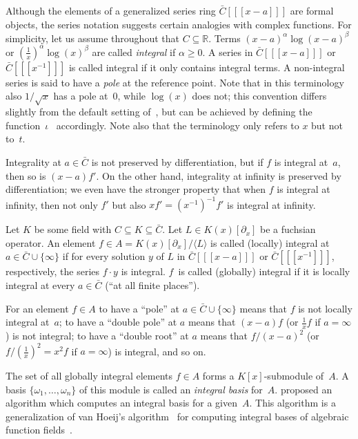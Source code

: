 \documentclass[final,1p,times,authoryear]{elsarticle}
\def\<#1>{\langle#1\rangle}
\let\set\mathbb
\begin{document}
Although the elements of a generalized series ring $\bar C[[[x-a]]]$ are formal
objects, the series notation suggests certain analogies with complex
functions.  For simplicity, let us assume throughout that $C\subseteq\set
R$. Terms $(x-a)^\alpha\log(x-a)^\beta$ or $(\tfrac1x)^\alpha\log(x)^\beta$ are
called \emph{integral} if $\alpha\geq0$. A series in
$\bar C[[[x-a]]]$ or $\bar C[[[x^{-1}]]]$ is called integral if it only contains integral
terms. A non-integral series is said to have a \emph{pole} at the reference
point. Note that in this terminology also $1/\sqrt{x}$ has a pole
at~$0$, while $\log(x)$ does not; this convention differs slightly from the
default setting of~\citep[Ex.~2]{kauers15b}, but can be achieved by defining
the function~$\iota$~\citep[Def.~1]{kauers15b} accordingly. Note also that
the terminology only refers to $x$ but not to~$t$.

Integrality at $a\in\bar C$ is not preserved by differentiation,
but if $f$ is integral at~$a$, then so is $(x-a)f'$. On the other hand,
integrality at infinity is preserved by differentiation; we even have the
stronger property that when $f$ is integral at infinity, then not only $f'$
but also $xf'=(x^{-1})^{-1}f'$ is integral at infinity.

Let $K$ be some field with $C\subseteq K\subseteq\bar C$.
Let $L\in K(x)[\partial_x]$ be a fuchsian operator. An element $f\in A=K(x)[\partial_x]/\<L>$
is called (locally) integral at $a\in\bar C\cup\{\infty\}$ if for every solution $y$
of $L$ in $\bar C[[[x-a]]]$ or $\bar C[[[x^{-1}]]]$, respectively, the series $f\cdot y$ is
integral. $f$~is called (globally) integral if it is locally integral at every
$a\in\bar C$ (``at all finite places'').

For an element $f\in A$ to have a ``pole'' at $a\in\bar C\cup\{\infty\}$ means
that $f$ is not locally integral at~$a$; to have a ``double pole'' at $a$ means
that $(x-a)f$ (or $\frac1xf$ if $a=\infty$) is not integral; to have a ``double
root'' at $a$ means that $f/(x-a)^2$ (or $f/(\frac1x)^2=x^2f$ if $a=\infty$) is integral,
and so on.

The set of all globally integral elements $f\in A$ forms a $K[x]$-submodule of~$A$.
A basis $\{\omega_1,\dots,\omega_n\}$ of this module is called an \emph{integral basis}
for~$A$. \cite{kauers15b} proposed an algorithm which computes an integral basis
for a given~$A$. This algorithm is a generalization of van Hoeij's
algorithm~\citep{vanHoeij94} for computing integral bases of algebraic function
fields~\citep{trager84,Rybowicz:1991:ACI:120694.120715}.
\end{document}
